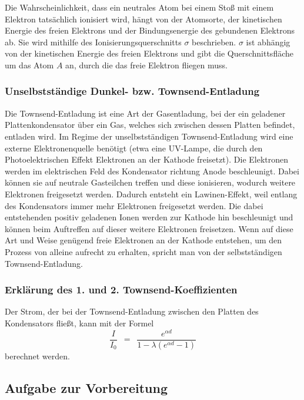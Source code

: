 \documentclass{article}
\newcommand{\widespace}{\enspace}
\newcommand{\wideeq}{\widespace = \widespace}
\begin{document}
Die Wahrscheinlichkeit, dass ein neutrales Atom bei einem Stoß mit einem Elektron
tatsächlich ionisiert wird, hängt von der Atomsorte, der kinetischen Energie des
freien Elektrons und der Bindungsenergie des gebundenen Elektrons ab.
Sie wird mithilfe des Ionisierungsquerschnitts $\sigma$ beschrieben.
$\sigma$ ist abhängig von der kinetischen Energie des freien Elektrons und gibt
die Querschnittsfläche um das Atom $A$ an, durch die das freie Elektron
fliegen muss.

\cite[34--35]{demtröder}


\subsubsection{Unselbstständige Dunkel- bzw. Townsend-Entladung}

Die Townsend-Entladung ist eine Art der Gasentladung, bei der ein geladener
Plattenkondensator über ein Gas, welches sich zwischen dessen Platten befindet,
entladen wird. Im Regime der unselbstständigen Townsend-Entladung
wird eine externe Elektronenquelle benötigt (etwa eine UV-Lampe, die durch den
Photoelektrischen Effekt Elektronen an der Kathode freisetzt).
Die Elektronen werden im elektrischen Feld des Kondensator richtung Anode
beschleunigt. Dabei können sie auf neutrale Gasteilchen treffen und diese
ionisieren, wodurch weitere Elektronen freigesetzt werden.
Dadurch entsteht ein Lawinen-Effekt, weil entlang des Kondensators immer mehr
Elektronen freigesetzt werden.
Die dabei entstehenden positiv geladenen Ionen werden zur Kathode hin beschleunigt
und können beim Auftreffen auf dieser weitere Elektronen freisetzen.
Wenn auf diese Art und Weise genügend freie Elektronen an der Kathode entstehen,
um den Prozess von alleine aufrecht zu erhalten, spricht man von der selbstständigen
Townsend-Entladung.

\cite[18--21]{koubek}


\subsubsection{Erklärung des 1. und 2. Townsend-Koeffizienten}

Der Strom, der bei der Townsend-Entladung zwischen den Platten des Kondensators
fließt, kann mit der Formel
\[
    \frac{I}{I_0} \wideeq
    \frac{
        e^{\alpha d}
    }{
        1 - \lambda (e^{\alpha d} - 1)
    }
\]
berechnet werden.

\cite[18--21]{koubek}


\subsection{Aufgabe zur Vorbereitung}
\end{document}
